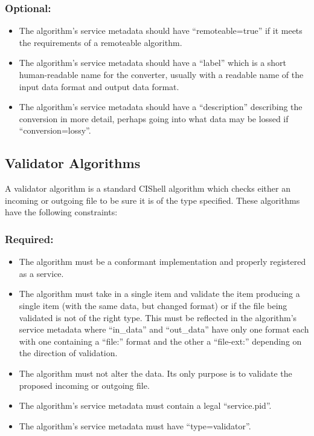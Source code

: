 \subsubsection*{Optional:}
\begin{itemize}
  \item The algorithm's service metadata should have ``remoteable=true'' if it
  meets the requirements of a remoteable algorithm.
  \item The algorithm's service metadata should have a ``label'' which is a
  short human-readable name for the converter, usually with a readable name of
  the input data format and output data format.
  \item The algorithm's service metadata should have a ``description''
  describing the conversion in more detail, perhaps going into what data may be
  lossed if ``conversion=lossy''.
\end{itemize}

\subsection{Validator Algorithms}

A validator algorithm is a standard CIShell algorithm which checks either an
incoming or outgoing file to be sure it is of the type specified. These algorithms
have the following constraints:

\subsubsection*{Required:}
\begin{itemize}
  \item The algorithm must be a conformant 
  implementation and properly registered as a service.
  \item The algorithm must take in a single  item and validate the
  item producing a single  item (with the same data, but changed
  format) or  if the file being validated is not of the right
  type. This must be reflected in the algorithm's service metadata where
  ``in\_data'' and ``out\_data'' have only one format each with one containing
  a ``file:'' format and the other a ``file-ext:'' depending on the direction
  of validation.
  \item The algorithm must not alter the data. Its only purpose is to validate
  the proposed incoming or outgoing file.
  \item The algorithm's service metadata must contain a legal ``service.pid''.
  \item The algorithm's service metadata must have ``type=validator''.
\end{itemize}

